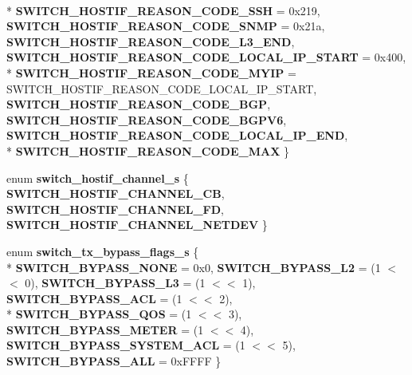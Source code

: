 \begin{DoxyCompactItemize}
\\*
{\bfseries S\+W\+I\+T\+C\+H\+\_\+\+H\+O\+S\+T\+I\+F\+\_\+\+R\+E\+A\+S\+O\+N\+\_\+\+C\+O\+D\+E\+\_\+\+S\+S\+H} = 0x219, 
{\bfseries S\+W\+I\+T\+C\+H\+\_\+\+H\+O\+S\+T\+I\+F\+\_\+\+R\+E\+A\+S\+O\+N\+\_\+\+C\+O\+D\+E\+\_\+\+S\+N\+M\+P} = 0x21a, 
{\bfseries S\+W\+I\+T\+C\+H\+\_\+\+H\+O\+S\+T\+I\+F\+\_\+\+R\+E\+A\+S\+O\+N\+\_\+\+C\+O\+D\+E\+\_\+\+L3\+\_\+\+E\+N\+D}, 
{\bfseries S\+W\+I\+T\+C\+H\+\_\+\+H\+O\+S\+T\+I\+F\+\_\+\+R\+E\+A\+S\+O\+N\+\_\+\+C\+O\+D\+E\+\_\+\+L\+O\+C\+A\+L\+\_\+\+I\+P\+\_\+\+S\+T\+A\+R\+T} = 0x400, 
\\*
{\bfseries S\+W\+I\+T\+C\+H\+\_\+\+H\+O\+S\+T\+I\+F\+\_\+\+R\+E\+A\+S\+O\+N\+\_\+\+C\+O\+D\+E\+\_\+\+M\+Y\+I\+P} = S\+W\+I\+T\+C\+H\+\_\+\+H\+O\+S\+T\+I\+F\+\_\+\+R\+E\+A\+S\+O\+N\+\_\+\+C\+O\+D\+E\+\_\+\+L\+O\+C\+A\+L\+\_\+\+I\+P\+\_\+\+S\+T\+A\+R\+T, 
{\bfseries S\+W\+I\+T\+C\+H\+\_\+\+H\+O\+S\+T\+I\+F\+\_\+\+R\+E\+A\+S\+O\+N\+\_\+\+C\+O\+D\+E\+\_\+\+B\+G\+P}, 
{\bfseries S\+W\+I\+T\+C\+H\+\_\+\+H\+O\+S\+T\+I\+F\+\_\+\+R\+E\+A\+S\+O\+N\+\_\+\+C\+O\+D\+E\+\_\+\+B\+G\+P\+V6}, 
{\bfseries S\+W\+I\+T\+C\+H\+\_\+\+H\+O\+S\+T\+I\+F\+\_\+\+R\+E\+A\+S\+O\+N\+\_\+\+C\+O\+D\+E\+\_\+\+L\+O\+C\+A\+L\+\_\+\+I\+P\+\_\+\+E\+N\+D}, 
\\*
{\bfseries S\+W\+I\+T\+C\+H\+\_\+\+H\+O\+S\+T\+I\+F\+\_\+\+R\+E\+A\+S\+O\+N\+\_\+\+C\+O\+D\+E\+\_\+\+M\+A\+X}
 \}
\item 
\hypertarget{group__HostInterface_gab22ee3b5247799ec2ca92c64cbbe5407}{enum {\bfseries switch\+\_\+hostif\+\_\+channel\+\_\+s} \{ {\bfseries S\+W\+I\+T\+C\+H\+\_\+\+H\+O\+S\+T\+I\+F\+\_\+\+C\+H\+A\+N\+N\+E\+L\+\_\+\+C\+B}, 
{\bfseries S\+W\+I\+T\+C\+H\+\_\+\+H\+O\+S\+T\+I\+F\+\_\+\+C\+H\+A\+N\+N\+E\+L\+\_\+\+F\+D}, 
{\bfseries S\+W\+I\+T\+C\+H\+\_\+\+H\+O\+S\+T\+I\+F\+\_\+\+C\+H\+A\+N\+N\+E\+L\+\_\+\+N\+E\+T\+D\+E\+V}
 \}}\label{group__HostInterface_gab22ee3b5247799ec2ca92c64cbbe5407}

\item 
\hypertarget{group__HostInterface_ga067ec27ed8be941b346ebbe527c5e6e0}{enum {\bfseries switch\+\_\+tx\+\_\+bypass\+\_\+flags\+\_\+s} \{ \\*
{\bfseries S\+W\+I\+T\+C\+H\+\_\+\+B\+Y\+P\+A\+S\+S\+\_\+\+N\+O\+N\+E} = 0x0, 
{\bfseries S\+W\+I\+T\+C\+H\+\_\+\+B\+Y\+P\+A\+S\+S\+\_\+\+L2} = (1 $<$$<$ 0), 
{\bfseries S\+W\+I\+T\+C\+H\+\_\+\+B\+Y\+P\+A\+S\+S\+\_\+\+L3} = (1 $<$$<$ 1), 
{\bfseries S\+W\+I\+T\+C\+H\+\_\+\+B\+Y\+P\+A\+S\+S\+\_\+\+A\+C\+L} = (1 $<$$<$ 2), 
\\*
{\bfseries S\+W\+I\+T\+C\+H\+\_\+\+B\+Y\+P\+A\+S\+S\+\_\+\+Q\+O\+S} = (1 $<$$<$ 3), 
{\bfseries S\+W\+I\+T\+C\+H\+\_\+\+B\+Y\+P\+A\+S\+S\+\_\+\+M\+E\+T\+E\+R} = (1 $<$$<$ 4), 
{\bfseries S\+W\+I\+T\+C\+H\+\_\+\+B\+Y\+P\+A\+S\+S\+\_\+\+S\+Y\+S\+T\+E\+M\+\_\+\+A\+C\+L} = (1 $<$$<$ 5), 
{\bfseries S\+W\+I\+T\+C\+H\+\_\+\+B\+Y\+P\+A\+S\+S\+\_\+\+A\+L\+L} = 0x\+F\+F\+F\+F
 \}}\label{group__HostInterface_ga067ec27ed8be941b346ebbe527c5e6e0}


\end{DoxyCompactItemize}
